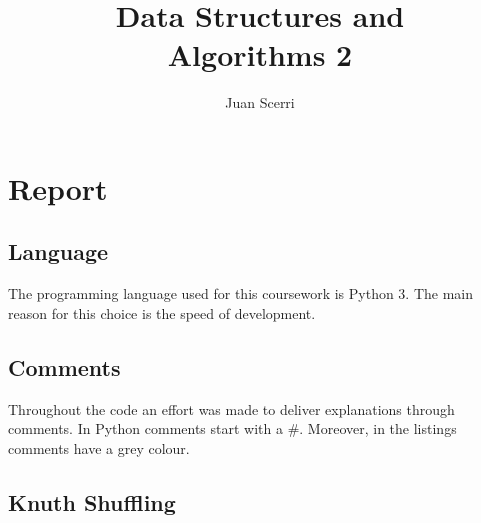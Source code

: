 \documentclass[article]{uom-coursework}
\title{Data Structures and\\Algorithms 2}
\author{Juan Scerri}
\begin{document}

\pagestyle{umpage}

\frontmatter

\maketitle %

\tableofcontents %

\clearpage

\lstlistoflistings

\clearpage

\mainmatter


\chapter*{Report}
\label{chap:report}


\section{Language}

The programming language used for this coursework is Python 3.
The main reason for this choice is the speed of development.

\section{Comments}

Throughout the code an effort was made to deliver explanations
through comments. In Python comments start with a \#. Moreover,
in the listings comments have a grey colour.

\section{Knuth Shuffling}
\end{document}
